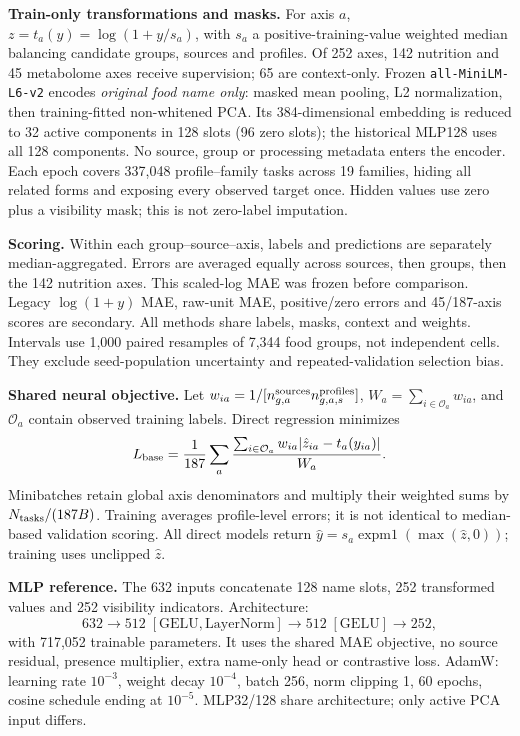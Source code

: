 \documentclass[10pt,a4paper]{article}
\newcommand{\sect}[1]{\vspace{3pt}{\large\bfseries\color{ink}#1}\par\vspace{2pt}}
\newcommand{\sub}[1]{\textbf{#1}\enspace}
\begin{document}
\sub{Train-only transformations and masks.}
For axis $a$, $z=t_a(y)=\log(1+y/s_a)$, with $s_a$ a positive-training-value weighted median balancing candidate groups, sources and profiles. Of 252 axes, 142 nutrition and 45 metabolome axes receive supervision; 65 are context-only. Frozen \texttt{all-MiniLM-L6-v2} encodes \emph{original food name only}: masked mean pooling, L2 normalization, then training-fitted non-whitened PCA. Its 384-dimensional embedding is reduced to 32 active components in 128 slots (96 zero slots); the historical MLP128 uses all 128 components. No source, group or processing metadata enters the encoder. Each epoch covers 337,048 profile--family tasks across 19 families, hiding all related forms and exposing every observed target once. Hidden values use zero plus a visibility mask; this is not zero-label imputation.

\sub{Scoring.}
Within each group--source--axis, labels and predictions are separately median-aggregated. Errors are averaged equally across sources, then groups, then the 142 nutrition axes. This scaled-log MAE was frozen before comparison. Legacy $\log(1+y)$ MAE, raw-unit MAE, positive/zero errors and 45/187-axis scores are secondary. All methods share labels, masks, context and weights. Intervals use 1,000 paired resamples of 7,344 food groups, not independent cells. They exclude seed-population uncertainty and repeated-validation selection bias.

\newpage
\sect{2. Model architectures and training details}
\sub{Shared neural objective.}
Let $w_{ia}=1/[n_{g,a}^{\rm sources}n_{g,a,s}^{\rm profiles}]$, $W_a=\sum_{i\in\mathcal O_a}w_{ia}$, and $\mathcal O_a$ contain observed training labels. Direct regression minimizes
\[
 L_{\rm base}=\frac{1}{187}\sum_a\frac{\sum_{i\in\mathcal O_a}w_{ia}\lvert\hat z_{ia}-t_a(y_{ia})\rvert}{W_a}.
\]
Minibatches retain global axis denominators and multiply their weighted sums by $N_{\rm tasks}/(187B)$. Training averages profile-level errors; it is not identical to median-based validation scoring. All direct models return $\hat y=s_a\operatorname{expm1}(\max(\hat z,0))$; training uses unclipped $\hat z$.

\sub{MLP reference.}
The 632 inputs concatenate 128 name slots, 252 transformed values and 252 visibility indicators. Architecture:
\[
632\!\to\!512\;[\mathrm{GELU,LayerNorm}]\!\to\!512\;[\mathrm{GELU}]\!\to\!252,
\]
with 717,052 trainable parameters. It uses the shared MAE objective, no source residual, presence multiplier, extra name-only head or contrastive loss. AdamW: learning rate $10^{-3}$, weight decay $10^{-4}$, batch 256, norm clipping 1, 60 epochs, cosine schedule ending at $10^{-5}$. MLP32/128 share architecture; only active PCA input differs.
\end{document}
